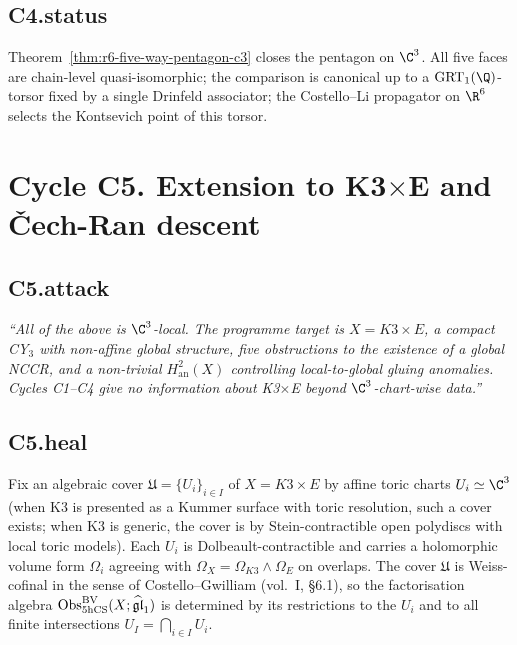 \subsection*{C4.status}

Theorem~\ref{thm:r6-five-way-pentagon-c3} closes the pentagon on
$\C^3$. All five faces are chain-level quasi-isomorphic; the
comparison is canonical up to a $\GRT_1(\Q)$-torsor fixed by a single
Drinfeld associator; the Costello--Li propagator on $\R^6$ selects
the Kontsevich point of this torsor.

\section*{Cycle C5. Extension to K3$\times$E and \v{C}ech-Ran descent}

\subsection*{C5.attack}

\emph{``All of the above is $\C^3$-local. The programme target is
$X = K3\times E$, a compact CY$_3$ with non-affine global structure,
five obstructions to the existence of a global NCCR, and a non-trivial
$H^2_{\mathrm{an}}(X)$ controlling local-to-global gluing anomalies.
Cycles C1--C4 give no information about K3$\times$E beyond
$\C^3$-chart-wise data.''}

\subsection*{C5.heal}

\begin{definition}
\label{def:r6-dwr-cover-k3e}
Fix an algebraic cover $\mathfrak U = \{U_i\}_{i\in I}$ of $X = K3\times E$
by affine toric charts $U_i\simeq\C^3$ (when K3 is presented as a
Kummer surface with toric resolution, such a cover exists; when K3 is
generic, the cover is by Stein-contractible open polydiscs with local
toric models). Each $U_i$ is Dolbeault-contractible and carries a
holomorphic volume form $\Omega_i$ agreeing with $\Omega_X = \Omega_{K3}
\wedge\Omega_E$ on overlaps. The cover $\mathfrak U$ is Weiss-cofinal
in the sense of Costello--Gwilliam (vol.~I, \S 6.1), so the
factorisation algebra $\mathrm{Obs}^{\mathrm{BV}}_{5\mathrm{hCS}}(X;\widehat{\mathfrak{gl}}_1)$ is determined by its
restrictions to the $U_i$ and to all finite intersections $U_I = \bigcap_{i\in I} U_i$.
\end{definition}

